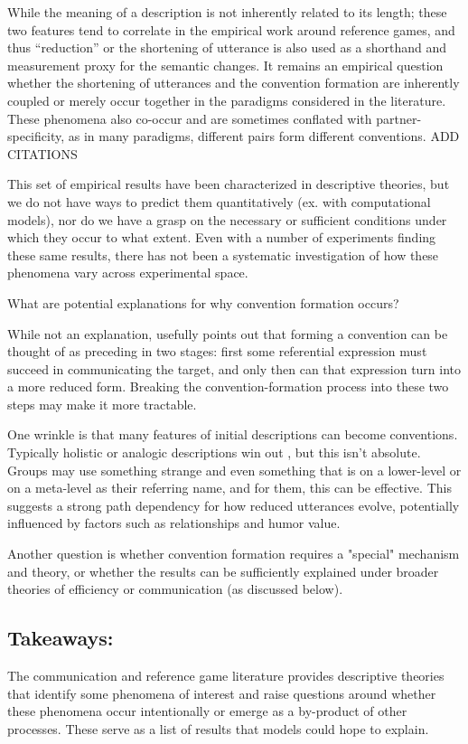 \documentclass[]{article}
\begin{document}
While the meaning of a description is not inherently related to its length; these two features tend to correlate in the empirical work around reference games, and thus ``reduction'' or the shortening of utterance is also used as a shorthand and measurement proxy for the semantic changes. It remains an empirical question whether the shortening of utterances and the convention formation are inherently coupled or merely occur together in the paradigms considered in the literature. These phenomena also co-occur and are sometimes conflated with partner-specificity, as in many paradigms, different pairs form different conventions. ADD CITATIONS

This set of empirical results have been characterized in descriptive theories, but we do not have ways to predict them quantitatively (ex. with computational models), nor do we have a grasp on the necessary or sufficient conditions under which they occur to what extent. Even with a number of experiments finding these same results, there has not been a systematic investigation of how these phenomena vary across experimental space. 

What are potential explanations for why convention formation occurs?

While not an explanation, \cite{leung2023} usefully points out that forming a convention can be thought of as preceding in two stages: first some referential expression must succeed in communicating the target, and only then can that expression turn into a more reduced form. Breaking the convention-formation process into these two steps may make it more tractable. 


One wrinkle is that many features of initial descriptions can become conventions. Typically holistic or analogic descriptions win out \cite{clark1986}, but this isn't absolute. Groups may use something strange and even something that is on a lower-level or on a meta-level as their referring name, and for them, this can be effective. This suggests a strong path dependency for how reduced utterances evolve, potentially influenced by factors such as relationships and humor value. 

Another question is whether convention formation requires a "special" mechanism and theory, or whether the results can be sufficiently explained under broader theories of efficiency or communication (as discussed below). 


\subsection{Takeaways:} The communication and reference game literature provides descriptive theories that identify some phenomena of interest and raise questions around whether these phenomena occur intentionally or emerge as a by-product of other processes. These serve as a list of results that models could hope to explain. 
\end{document}
